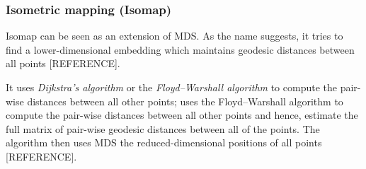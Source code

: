 \documentclass[journal, a4paper]{IEEEtran}
\begin{document}
%	
%	


\hfill
\subsubsection{Isometric mapping (Isomap)}

Isomap can be seen as an extension of MDS. %
As the name suggests, it tries to find a lower-dimensional embedding which maintains geodesic distances between all points [REFERENCE].  

It uses \textit{Dijkstra's algorithm} or  the \textit{Floyd–Warshall algorithm} to compute the pair-wise distances between all other points;  uses the Floyd–Warshall algorithm to compute the pair-wise distances between all other points and hence, estimate the full matrix of pair-wise geodesic distances between all of the points. The algorithm then uses MDS the reduced-dimensional positions of all points [REFERENCE].


%
\end{document}
